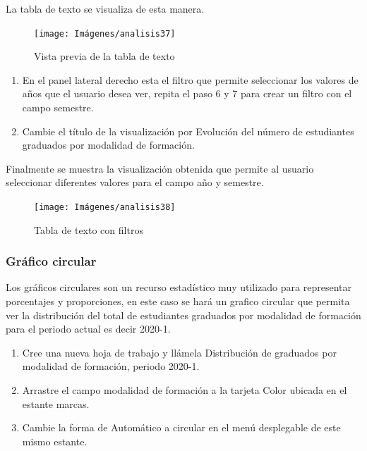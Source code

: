 \documentclass[
]{book}
\begin{document}
La tabla de texto se visualiza de esta manera.

\begin{figure}

{\centering \texttt{[image: Imágenes/analisis37]} 

}

\caption{Vista previa de la tabla de texto}\label{fig:paso7-1tablatexto-fig}
\end{figure}

\begin{enumerate}
\def\labelenumi{\arabic{enumi}.}
\setcounter{enumi}{7}
\item
  En el panel lateral derecho esta el filtro que permite seleccionar los valores de años que el usuario desea ver, repita el paso 6 y 7 para crear un filtro con el campo semestre.
\item
  Cambie el título de la visualización por Evolución del número de estudiantes graduados por modalidad de formación.
\end{enumerate}

Finalmente se muestra la visualización obtenida que permite al usuario seleccionar diferentes valores para el campo año y semestre.

\begin{figure}

{\centering \texttt{[image: Imágenes/analisis38]} 

}

\caption{Tabla de texto con filtros}\label{fig:tablatexto-fig}
\end{figure}

\hypertarget{graficocircular}{%
\subsubsection{Gráfico circular}\label{graficocircular}}

Los gráficos circulares son un recurso estadístico muy utilizado para representar porcentajes y proporciones, en este caso se hará un grafico circular que permita ver la distribución del total de estudiantes graduados por modalidad de formación para el periodo actual es decir 2020-1.

\begin{enumerate}
\def\labelenumi{\arabic{enumi}.}
\item
  Cree una nueva hoja de trabajo y llámela Distribución de graduados por modalidad de formación, periodo 2020-1.
\item
  Arrastre el campo modalidad de formación a la tarjeta Color ubicada en el estante marcas.
\item
  Cambie la forma de Automático a circular en el menú desplegable de este mismo estante.
\end{enumerate}
\end{document}
